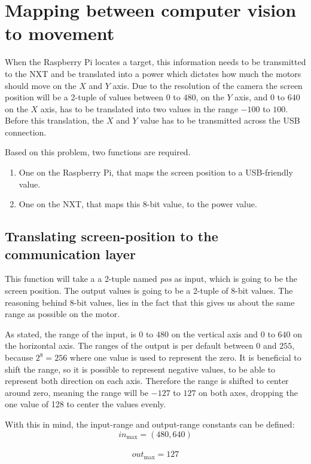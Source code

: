 \section{Mapping between computer vision to movement}
When the Raspberry Pi locates a target, this information needs to be transmitted to the NXT and be translated into a power which dictates how much the motors should move on the $X$ and $Y$ axis.
Due to the resolution of the camera the screen position will be a 2-tuple of values between $0$ to $480$, on the $Y$ axis, and $0$ to $640$ on the $X$ axis, has to be translated into two values in the range $-100$ to $100$.
Before this translation, the $X$ and $Y$ value has to be transmitted across the USB connection.

Based on this problem, two functions are required.
\begin{enumerate}
	\item One on the Raspberry Pi, that maps the screen position to a USB-friendly value.
	\item One on the NXT, that maps this 8-bit value, to the power value.
\end{enumerate}


\subsection{Translating screen-position to the communication layer}
This function will take a a 2-tuple named \textit{pos} as input, which is going to be the screen position.
The output values is going to be a 2-tuple of 8-bit values.
The reasoning behind 8-bit values, lies in the fact that this gives us about the same range as possible on the motor.

As stated, the range of the input, is $0$ to $480$ on the vertical axis and $0$ to $640$ on the horizontal axis.
The ranges of the output is per default between $0$ and $255$, because $2^8 = 256 $ where one value is used to represent the zero.
It is beneficial to shift the range, so it is possible to represent negative values, to be able to represent both direction on each axis.
Therefore the range is shifted to center around zero, meaning the range will be $-127$ to $127$ on both axes, dropping the one value of 128 to center the values evenly.

With this in mind, the input-range and output-range constants can be defined:\\
$$in_\text{max} = (480,640)$$\\
$$out_\text{max} = 127$$

